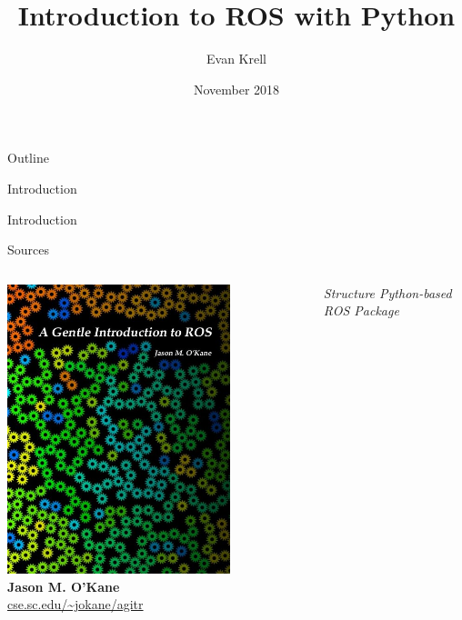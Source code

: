 \documentclass[9pt]{beamer}
\title[PPT - ROS Intro]{Introduction to ROS with Python}
\author{Evan Krell}
\institute{Texas A\&M University - Corpus Christi}
\date{November 2018}
\begin{document}
\begin{frame}
  \titlepage
\end{frame}

\begin{frame}{Outline}
  \tableofcontents
\end{frame}

\begin{section}{Introduction}
    \begin{frame}{Introduction}
        \begin{block}{Sources}
            \begin{columns}
                \begin{column}{0.5\textwidth}
                    \begin{center}
                        \includegraphics[width=0.75\textwidth,trim={0cm 0cm 0cm 0cm},clip]{img/cover_agitr.jpg} \\
                        \textbf{Jason M. O'Kane} \\
                        \url{cse.sc.edu/~jokane/agitr}
                    \end{center}    
                \end{column}
                \begin{column}{0.5\textwidth}
                    \begin{center}
                        \textit{Structure Python-based ROS Package} \\

\end{center}
\end{column}
\end{columns}
\end{block}
\end{frame}
\end{section}
\end{document}
